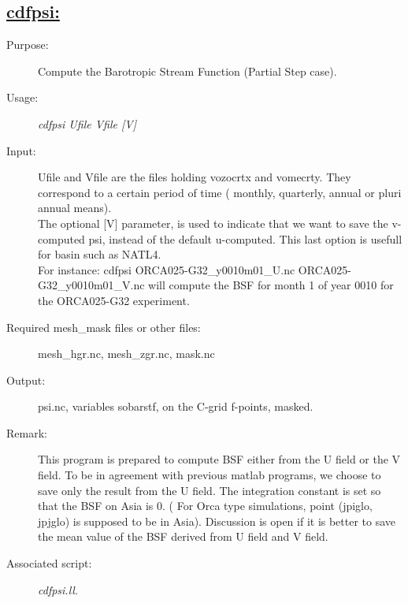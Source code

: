 \documentclass[a4paper,11pt]{article}
\begin{document}
\subsection*{\underline{cdfpsi:}}
\begin{description}
\item[Purpose:] Compute the Barotropic Stream Function  (Partial Step case).
\item[Usage:] {\em cdfpsi  Ufile Vfile [V]}
\item[Input:] Ufile and Vfile are the files holding vozocrtx and vomecrty.
They correspond to a certain period of time ( monthly, quarterly, annual or
pluri annual means). \\
The optional [V] parameter, is used to indicate that we want to save the v-computed psi, instead of the default
u-computed. This last option is usefull for basin such as NATL4. \\
For instance: cdfpsi ORCA025-G32\_y0010m01\_U.nc ORCA025-G32\_y0010m01\_V.nc 
will compute the BSF for month 1 of year 0010 for the ORCA025-G32 experiment.
\item[Required mesh\_mask files or other files:]   mesh\_hgr.nc, mesh\_zgr.nc, mask.nc  \\
\item[Output:]psi.nc, variables sobarstf, on the C-grid f-points, masked.
\item[Remark:]  This program is prepared to compute BSF either from the U field or the V field. To be in agreement with previous
matlab programs, we choose to save only the result from the U field. The integration constant is set so that the BSF
on Asia is 0. ( For Orca type simulations, point (jpiglo, jpjglo) is supposed to be in Asia). Discussion is open if it
is better to save the mean value of the BSF derived from U field and V field. 
\item[Associated script:] {\em cdfpsi.ll}. 
\end{description}

\newpage
\end{document}
